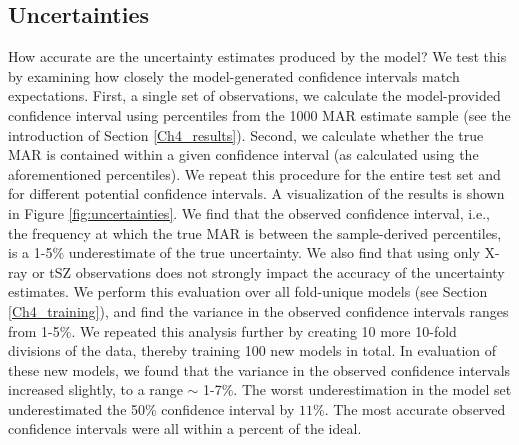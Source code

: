 \subsection{Uncertainties}\label{Ch4_uncertainty}
How accurate are the uncertainty estimates produced by the model? We test this by examining how closely the model-generated confidence intervals match expectations. First, a single set of observations, we calculate the model-provided confidence interval using percentiles from the 1000 MAR estimate sample (see the introduction of Section \ref{Ch4_results}). Second, we calculate whether the true MAR is contained within a given confidence interval (as calculated using the aforementioned percentiles). We repeat this procedure for the entire test set and for different potential confidence intervals. A visualization of the results is shown in Figure \ref{fig:uncertainties}. We find that the observed confidence interval, i.e., the frequency at which the true MAR is between the sample-derived percentiles, is a 1-5\% underestimate of the true uncertainty. We also find that using only X-ray or tSZ observations does not strongly impact the accuracy of the uncertainty estimates. We perform this evaluation over all fold-unique models (see Section \ref{Ch4_training}), and find the variance in the observed confidence intervals ranges from 1-5\%. We repeated this analysis further by creating 10 more 10-fold divisions of the data, thereby training 100 new models in total. In evaluation of these new models, we found that the variance in the observed confidence intervals increased slightly, to a range $\sim$ 1-7\%. The worst underestimation in the model set underestimated the 50\% confidence interval by $11\%$. The most accurate observed confidence intervals were all within a percent of the ideal.

